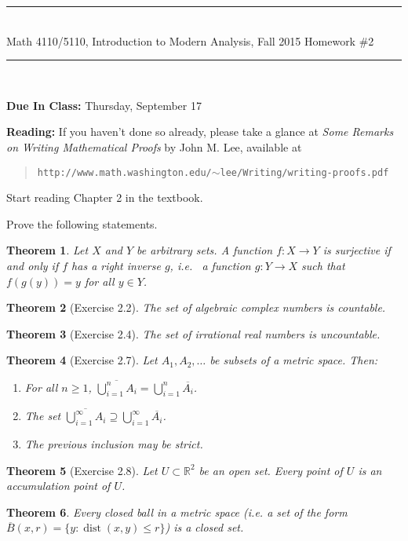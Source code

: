\documentclass[11pt,reqno]{amsart}
\newcommand{\RR}{\mathbb{R}}
\newcommand{\spacer}{\vspace{.4cm}}
\newcommand{\dist}{\mathop\mathrm{dist}\nolimits}
\newtheorem{theorem}{Theorem}
\begin{document}
\begin{center}
\hrule \ \\
\large \textsf{Math 4110/5110, Introduction to Modern Analysis, Fall 2015} \hfill
\Large Homework \#2 \vspace{.25cm} \hrule \
\end{center}

\spacer

\textbf{Due In Class:} Thursday, September 17  \spacer

\textbf{Reading:} If you haven't done so already, please take a glance at \emph{Some Remarks on Writing Mathematical Proofs} by John M. Lee, available at \begin{quotation}\texttt{http://www.math.washington.edu/$\sim$lee/Writing/writing-proofs.pdf}\end{quotation} \spacer

Start reading Chapter 2 in the textbook.  \spacer

Prove the following statements.

\begin{theorem} Let $X$ and $Y$ be arbitrary sets. A function $f:X\rightarrow Y$ is surjective if and only if $f$ has a right inverse $g$, i.e.~ a function $g:Y\rightarrow X$ such that $f(g(y))=y$ for all $y\in Y$.\end{theorem}

\begin{theorem}[Exercise 2.2] The set of algebraic complex numbers is countable.
\end{theorem}

\begin{theorem}[Exercise 2.4] The set of irrational real numbers is uncountable.\end{theorem}

\begin{theorem}[Exercise 2.7] Let $A_1,A_2,\dots$ be subsets of a metric space. Then: \begin{enumerate} \item[(a)] For all $n\geq 1$, $\overline{\bigcup_{i=1}^n A_i}=\bigcup_{i=1}^n \overline{A_i}$.
\item[(b)] The set $\overline{\bigcup_{i=1}^\infty A_i}\supseteq \bigcup_{i=1}^\infty \overline{A_i}$.
\item[(c)] The previous inclusion may be strict.
\end{enumerate}\end{theorem}

\begin{theorem}[Exercise 2.8] Let $U\subset\RR^2$ be an open set. Every point of $U$ is an accumulation point of $U$.\end{theorem}

\begin{theorem} Every closed ball in a metric space (i.e. a set of the form $\overline{B}(x,r)=\{y: \dist(x,y)\leq r\}$) is a closed set.\end{theorem}
\end{document}
